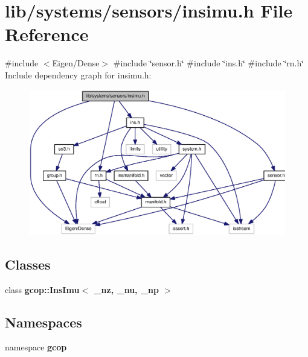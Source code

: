 \section{lib/systems/sensors/insimu.h \-File \-Reference}
\label{insimu_8h}
{\ttfamily \#include $<$\-Eigen/\-Dense$>$}\*
{\ttfamily \#include \char`\"{}sensor.\-h\char`\"{}}\*
{\ttfamily \#include \char`\"{}ins.\-h\char`\"{}}\*
{\ttfamily \#include \char`\"{}rn.\-h\char`\"{}}\*
\-Include dependency graph for insimu.\-h\-:
\nopagebreak
\begin{figure}[H]
\begin{center}
\leavevmode
\includegraphics[width=350pt]{insimu_8h__incl}
\end{center}
\end{figure}
\subsection*{\-Classes}
\begin{DoxyCompactItemize}
\item 
class {\bf gcop\-::\-Ins\-Imu$<$ \-\_\-nz, \-\_\-nu, \-\_\-np $>$}
\end{DoxyCompactItemize}
\subsection*{\-Namespaces}
\begin{DoxyCompactItemize}
\item 
namespace {\bf gcop}
\end{DoxyCompactItemize}
